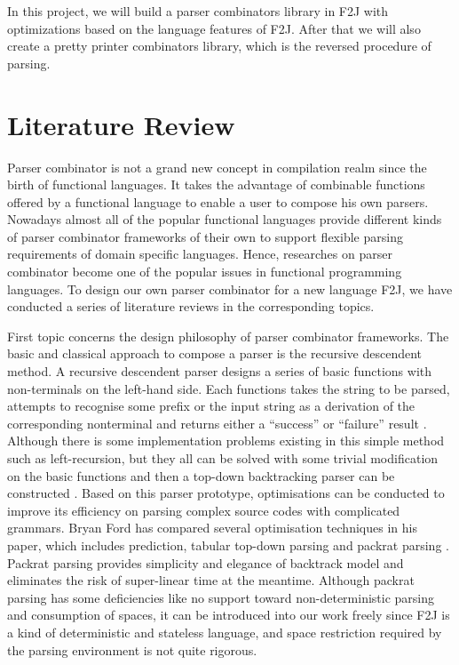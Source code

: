 \documentclass[9pt,a4paper,twocolumn]{article}
\begin{document}
In this project, we will build a parser combinators library in F2J with optimizations based on the language features of F2J. After that we will also create a pretty printer combinators library, which is the reversed procedure of parsing.

\section{Literature Review}

Parser combinator is not a grand new concept in compilation realm since the birth of functional languages. It takes the advantage of combinable functions offered by a functional language to enable a user to compose his own parsers. Nowadays almost all of the popular functional languages provide different kinds of parser combinator frameworks of their own to support flexible parsing requirements of domain specific languages. Hence, researches on parser combinator become one of the popular issues in functional programming languages. To design our own parser combinator for a new language F2J, we have conducted a series of literature reviews in the corresponding topics.

First topic concerns the design philosophy of parser combinator frameworks. The basic and classical approach to compose a parser is the recursive descendent method. A recursive descendent parser designs a series of basic functions with non-terminals on the left-hand side. Each functions takes the string to be parsed, attempts to recognise some prefix or the input string as a derivation of the corresponding nonterminal and returns either a “success” or “failure” result \cite{Ford2002}. Although there is some implementation problems existing in this simple method such as left-recursion, but they all can be solved with some trivial modification on the basic functions and then a top-down backtracking parser can be constructed \cite{Compilers:2006}. Based on this parser prototype, optimisations can be conducted to improve its efficiency on parsing complex source codes with complicated grammars. Bryan Ford has compared several optimisation techniques in his paper, which includes prediction, tabular top-down parsing and packrat parsing \cite{Ford2002}. Packrat parsing provides simplicity and elegance of backtrack model and eliminates the risk of super-linear time at the meantime. Although packrat parsing has some deficiencies like no support toward non-deterministic parsing and consumption of spaces, it can be introduced into our work freely since F2J is a kind of deterministic and stateless language, and space restriction required by the parsing environment is not quite rigorous.
\end{document}
